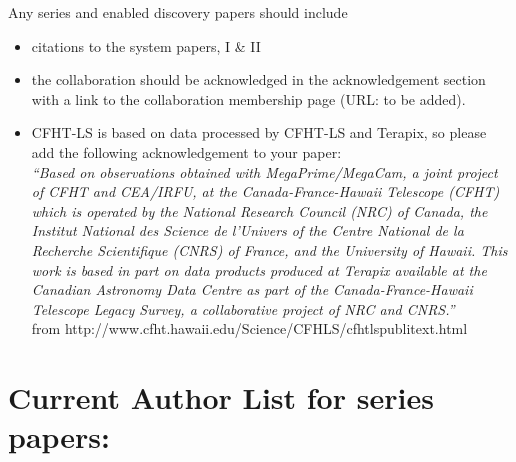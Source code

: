 \documentclass[a4paper]{article}
\begin{document}
Any \sw series and \sw enabled discovery papers should include
\begin{itemize}
\item citations to the \sw system papers, \sw I \& II
\item the collaboration should be acknowledged in the acknowledgement section with a link to the collaboration membership page (URL: to be added).
\item \sw CFHT-LS is based on data processed by CFHT-LS and Terapix, so please add the following acknowledgement to your paper:\\
\textit{``Based on observations obtained with MegaPrime/MegaCam, a joint project of CFHT and CEA/IRFU, at the Canada-France-Hawaii Telescope (CFHT) which is operated by the National Research Council (NRC) of Canada, the Institut National des Science de l'Univers of the Centre National de la Recherche Scientifique (CNRS) of France, and the University of Hawaii. This work is based in part on data products produced at Terapix available at the Canadian Astronomy Data Centre as part of the Canada-France-Hawaii Telescope Legacy Survey, a collaborative project of NRC and CNRS.''}\\
from http://www.cfht.hawaii.edu/Science/CFHLS/cfhtlspublitext.html

\end{itemize}


\appendix
\section{Current Author List for \sw series papers:}
\label{sec:appa}
{\small }

\end{document}

